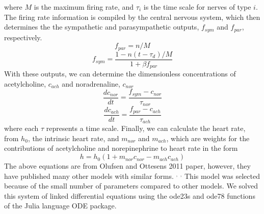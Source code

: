 \documentclass[12pt]{article}
\begin{document}
where $M$ is the maximum firing rate, and $\tau_i$ is the time scale for nerves of type $i$. 
The firing rate information is compiled by the central nervous system, which then determines the the sympathetic and parasympathetic outputs, $f_{sym}$ and $f_{par}$, respectively. 
\begin{equation}
f_{par} = n/M
\end{equation}
\begin{equation}
f_{sym} = \frac{1-n(t-\tau_d)/M}{1+\beta f_{par}}
\end{equation}
With these outputs, we can determine the dimensionless concentrations of acetylcholine, $c_{ach}$ and noradrenaline, $c_{nor}$
\begin{equation}
\label{dcnordt}
\frac{dc_{nor}}{dt} = \frac{f_{sym}-c_{nor}}{\tau_{nor}}
\end{equation}
\begin{equation}
\label{dcachdt}
\frac{dc_{ach}}{dt} = \frac{f_{par}-c_{ach}}{\tau_{ach}}
\end{equation}
where each $\tau$ represents a time scale. 
Finally, we can calculate the heart rate, from $h_0$, the intrinsic heart rate, and $m_{nor}$ and $m_{ach}$, which are weights for the contributions of acetylcholine and norepinephrine  to heart rate in the form
\begin{equation}
\label{h}
h = h_0(1+m_{nor}c_{nor} - m_{ach}c_{ach})
\end{equation}
The above equations are from Olufsen and Ottesens 2011 paper, however, they have published many other models with similar forms.\citep{olufsen2006modeling} $^,$ \citep{ottesen1997modelling} $^,$ \citep{olufsen2008modeling} This model was selected because of the small number of parameters compared to other models. We solved this system of linked differential equations using the ode23s and ode78 functions of the Julia language ODE package. 
\end{document}
